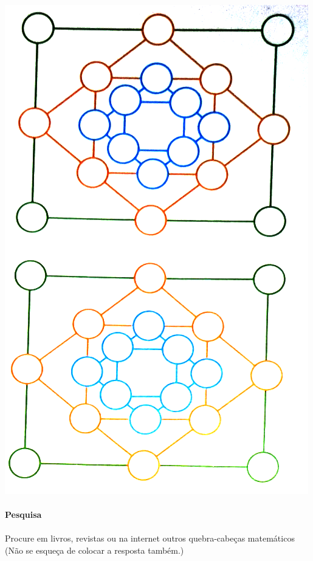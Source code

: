 \documentclass[a4paper,14pt]{article}
\begin{document}
\begin{multicols}{2}
\begin{enumerate}
    		\newpage
    		\includegraphics[width=1.1\linewidth]{6FMA46_imagens/imagem6} 
    		\\\\
    		\textbf{Pesquisa}\\\\
    		Procure em livros, revistas ou na internet outros quebra-cabeças matemáticos (Não se esqueça de colocar a resposta também.)\\\\\\\\\\\\\\\\\\\\\\\\\\\\

\end{enumerate}
\end{multicols}
\end{document}
